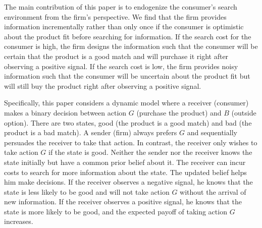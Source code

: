 \documentclass[11pt]{extarticle}
\begin{document}

The main contribution of this paper is to endogenize the consumer's search environment from the firm's perspective. We find that the firm provides information incrementally rather than only once if the consumer is optimistic about the product fit before searching for information. If the search cost for the consumer is high, the firm designs the information such that the consumer will be certain that the product is a good match and will purchase it right after observing a positive signal. If the search cost is low, the firm provides noisy information such that the consumer will be uncertain about the product fit but will still buy the product right after observing a positive signal. 

Specifically, this paper considers a dynamic model where a receiver (consumer) makes a binary decision between action $G$ (purchase the product) and $B$ (outside option). There are two states, good (the product is a good match) and bad (the product is a bad match). A sender (firm) always prefers $G$ and sequentially persuades the receiver to take that action. In contrast, the receiver only wishes to take action $G$ if the state is good. Neither the sender nor the receiver knows the state initially but have a common prior belief about it. The receiver can incur costs to search for more information about the state. The updated belief helps him make decisions. If the receiver observes a negative signal, he knows that the state is less likely to be good and will not take action $G$ without the arrival of new information. If the receiver observes a positive signal, he knows that the state is more likely to be good, and the expected payoff of taking action $G$ increases. 
\end{document}
